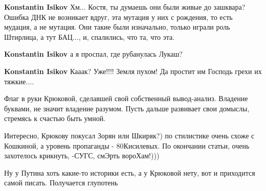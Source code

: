 \begin{itemize}
\begin{itemize}
\textbf{Konstantin Isikov} Хм... Костя, ты думаешь они были живые до зашквара? Ошибка ДНК не возникает вдруг, эта мутация у них с рождения, то есть мудация, а не мутация. Они такие были изначально, только играли роль Штирлица, а тут БАЦ..., и, спалились, что та, что эта.

 
\textbf{Konstantin Isikov} а я проспал, где рубанулась Лукаш?

 
\textbf{Konstantin Isikov} Кааак? Уже!!!! Земля пухом! Да простит им Господь грехи их тяжкие....
\end{itemize}

 
Флаг в руки Крюковой, сделавшей свой собственный вывод-анализ. Владение
буквами, не значит владение разумом. Пусть дальше развивает свои домыслы,
стремясь к счастью быть умной.

 
Интересно, Крюкову покусал Зорян или Шкиряк?) по стилистике очень схоже с Кошкиной, а уровень пропаганды - 80Кисилевых. По окончании статьи, очень захотелось крикнуть, -СУГС, смЭрть вороХам!)))

 
Ну у Путина хоть какие-то историки есть, а у Крюковой нету, вот и приходится самой писать. Получается глупотень

\begin{itemize}
 

\end{itemize}
\end{itemize}
